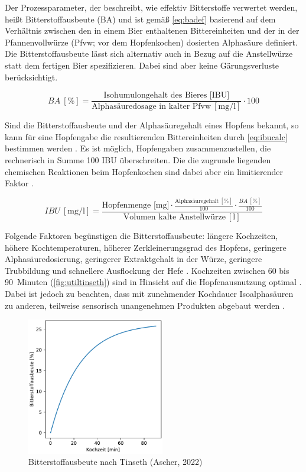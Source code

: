 \documentclass[a4paper,parskip=half]{scrartcl}
\newcommand{\BA}{\mathit{BA}}
\newcommand{\IBU}{\mathit{IBU}}
\newcommand{\uper}{\:[\text{\%}]}
\newcommand{\uli}{\:[\text{l}]}
\newcommand{\ucon}{\:[\text{mg/l}]}
\begin{document}
Der Prozessparameter, der beschreibt, wie effektiv Bitterstoffe verwertet werden, heißt Bitterstoffausbeute (BA) und ist gemäß \autoref{eq:badef} basierend auf dem Verhältnis zwischen den in einem Bier enthaltenen Bittereinheiten und der in der Pfannenvollwürze (Pfvw; vor dem Hopfenkochen) dosierten Alphasäure definiert. Die Bitterstoffausbeute lässt sich alternativ auch in Bezug auf die Anstellwürze statt dem fertigen Bier spezifizieren. Dabei sind aber keine Gärungsverluste berücksichtigt. \parencite[163]{Annemueller2015} 

\begin{equation}
\BA \uper = \frac{\text{Isohumulongehalt des Bieres [IBU]}}{\text{Alphasäuredosage in kalter Pfvw} \ucon} \cdot 100
\label{eq:badef}
\end{equation}

Sind die Bitterstoffausbeute und der Alphasäuregehalt eines Hopfens bekannt, so kann für eine Hopfengabe die resultierenden Bittereinheiten durch \autoref{eq:ibucalc} bestimmen werden \parencite{Thesseling2019}. Es ist möglich, Hopfengaben zusammenzustellen, die rechnerisch in Summe 100 IBU überschreiten. Die die zugrunde liegenden chemischen Reaktionen beim Hopfenkochen sind dabei aber ein limitierender Faktor \parencite{Deutschman2017}.

\begin{equation}
\IBU \ucon = \frac{\text{Hopfenmenge [mg]} \cdot \frac{\text{Alphasäuregehalt} \uper}{100} \cdot \frac{\BA \uper}{100}}{\text{Volumen kalte Anstellwürze} \uli}
\label{eq:ibucalc}
\end{equation}

Folgende Faktoren begünstigen die Bitterstoffausbeute: längere Kochzeiten, höhere Kochtemperaturen, höherer Zerkleinerungsgrad des Hopfens, geringere Alphasäuredosierung, geringerer Extraktgehalt in der Würze, geringere Trubbildung und schnellere Ausflockung der Hefe \parencite{Hosom2017}. Kochzeiten zwischen 60 bis 90~Minuten (\autoref{fig:utiltinseth}) sind in Hinsicht auf die Hopfenausnutzung optimal \parencite[5]{Malowicki2005}. Dabei ist jedoch zu beachten, dass mit zunehmender Kochdauer Isoalphasäuren zu anderen, teilweise sensorisch unangenehmen Produkten abgebaut werden \parencite{Kappler2010}.

\begin{figure}[H]
\centering
\includegraphics[width=6cm]{graph_tinseth.pdf}
\caption{Bitterstoffausbeute nach Tinseth (Ascher, 2022)}
\label{fig:utiltinseth}
\end{figure}
\end{document}
